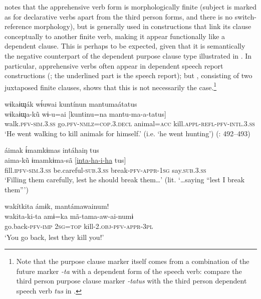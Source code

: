 \documentclass[output=paper,colorlinks,citecolor=brown,draft]{langscibook}
\begin{document}
\citet[73--74]{Overall2017b} notes that the apprehensive verb form is morphologically finite (subject is marked as for declarative verbs apart from the third person forms, and there is no switch-reference morphology), but is generally used in constructions that link its clause conceptually to another finite verb, making it appear functionally like a dependent clause. This is perhaps to be expected, given that it is semantically the negative counterpart of the dependent purpose clause type illustrated in . In particular, apprehensive verbs often appear in dependent speech report constructions (; the underlined part is the speech report); but , consisting of two juxtaposed finite clauses, shows that this is not necessarily the case.\footnote{Note that the purpose clause marker itself comes from a combination of the future marker \textit{{}-ta} with a dependent form of the speech verb: compare the third person purpose clause marker \textit{\nobreakdash-tatus}  with the third person dependent speech verb \textit{tus} in .}

\ea\label{ex:agu:36}
    \glll wɨkaɨɰák wɨ́uwai kuntínun mantumaátatus \\ 
          wɨkaɨɰa-k\~u  wɨ-u=ai  [kuntinu=na mantu-ma-a-tatus]\\
          walk\textsc{.pfv-sim.3.ss}  go.\textsc{pfv-nmlz=cop.3.decl}  animal=\textsc{acc} kill.\textsc{appl-refl-pfv-intl.3.ss}\\
    \glt ‘He went walking to kill animals for himself.’ (i.e. ‘he went hunting’) (\citealt{Overall2017a}: 492–493)
\z 

\ea\label{ex:agu:37}
    \glll áimak ɨ́mamkɨmas intáhaiŋ tus \\ 
          aima-kũ  ɨmamkɨma-sã  [\underline{inta-ha-i-ha}  tus] \\
          fill.\textsc{ipfv}{}-\textsc{sim.3.ss}  be.careful-\textsc{sub.3.ss}  break-\textsc{pfv-appr-1sg}  say.\textsc{sub.3.ss}\\
    \glt ‘Filling them carefully, lest he should break them…’ (lit. ‘…saying “lest I break them”’) \citep[363]{Overall2017a}
\z 

 \ea\label{ex:agu:38}
    \glll wakítkita ámɨk, mantámawainum! \\ 
          wakita-ki-ta  amɨ=ka  mã-tama-aw-ai-numɨ \\
          go.back\textsc{{}-pfv-imp}  \textsc{2sg=top}\textsubscript{} kill-2\textsc{.obj-pfv-appr-3pl} \\
    \glt ‘You go back, lest they kill you!’ \citep[491]{Overall2017a}
\z 
\end{document}
